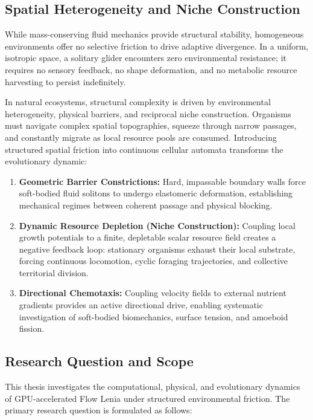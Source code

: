 \subsection{Spatial Heterogeneity and Niche Construction}
\label{subsec:intro_spatial_heterogeneity}

While mass-conserving fluid mechanics provide structural stability, homogeneous environments offer no selective friction to drive adaptive divergence. In a uniform, isotropic space, a solitary glider encounters zero environmental resistance; it requires no sensory feedback, no shape deformation, and no metabolic resource harvesting to persist indefinitely.

In natural ecosystems, structural complexity is driven by environmental heterogeneity, physical barriers, and reciprocal niche construction. Organisms must navigate complex spatial topographies, squeeze through narrow passages, and constantly migrate as local resource pools are consumed. Introducing structured spatial friction into continuous cellular automata transforms the evolutionary dynamic:

\begin{enumerate}
    \item \textbf{Geometric Barrier Constrictions:} Hard, impassable boundary walls force soft-bodied fluid solitons to undergo elastomeric deformation, establishing mechanical regimes between coherent passage and physical blocking.
    \item \textbf{Dynamic Resource Depletion (Niche Construction):} Coupling local growth potentials to a finite, depletable scalar resource field creates a negative feedback loop: stationary organisms exhaust their local substrate, forcing continuous locomotion, cyclic foraging trajectories, and collective territorial division.
    \item \textbf{Directional Chemotaxis:} Coupling velocity fields to external nutrient gradients provides an active directional drive, enabling systematic investigation of soft-bodied biomechanics, surface tension, and amoeboid fission.
\end{enumerate}

\subsection{Research Question and Scope}
\label{subsec:intro_research_questions}

This thesis investigates the computational, physical, and evolutionary dynamics of GPU-accelerated Flow Lenia under structured environmental friction. The primary research question is formulated as follows:

